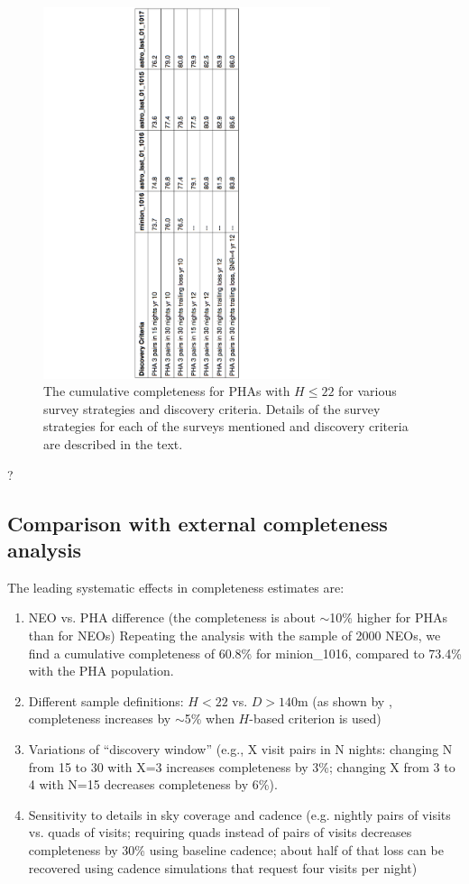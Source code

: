\begin{figure}
\centering
\includegraphics[width=0.75\textwidth]{figures/PHA_cumulative_completeness}
\caption{The cumulative completeness for PHAs with $H\le22$ for various survey strategies and discovery criteria. Details of the survey strategies for each of the surveys mentioned and discovery criteria are described in the text.
\label{tab:completeness}}
\end{figure}
?         

\subsection{Comparison with external completeness analysis}

The leading systematic effects in completeness estimates are: 
\begin{enumerate}
\item NEO vs. PHA difference (the completeness is about $\sim$10\% higher for PHAs than for NEOs) 
Repeating the analysis with the sample of 2000 NEOs, we find a cumulative completeness of 60.8\% for minion\_1016, compared to 73.4\% with the PHA population. 

\item Different sample definitions: $H<22$ vs. $D>140$m (as shown by \citep{GMS2016}, completeness increases by $\sim$5\% when $H$-based criterion is used) 
\item Variations of ``discovery window'' (e.g., X visit pairs in N nights: changing N from 15 to 30 with X=3 increases
          completeness by 3\%; changing X from 3 to 4 with N=15 decreases completeness by 6\%). 
\item Sensitivity to details in sky coverage and cadence (e.g. nightly pairs of visits vs. quads of visits;
          requiring quads instead of pairs of visits decreases completeness by 30\% using baseline cadence; 
          about half of that loss can be recovered using cadence simulations that request four visits per night) 
\end{enumerate}          
    
